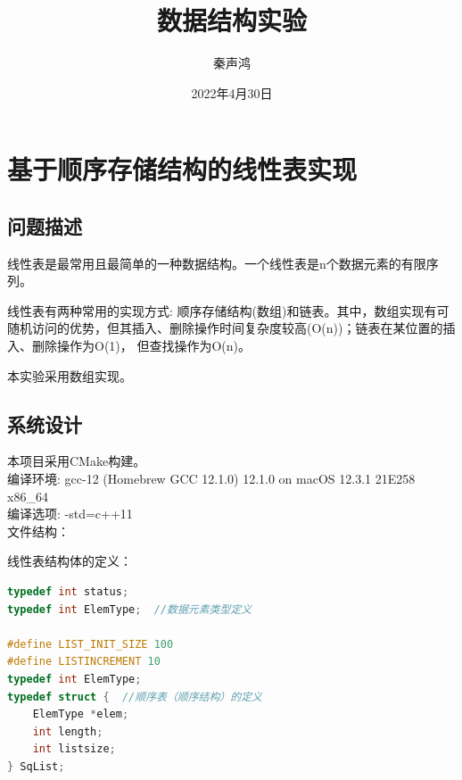 \documentclass[supercite]{Experimental_Report}
\title{~~~~~~数据结构实验~~~~~~}
\author{秦声鸿}
\date{2022年4月30日}
\theoremstyle{definition}
\begin{document}
\maketitle

\clearpage


\tableofcontents[level=2]

\clearpage


\section{基于顺序存储结构的线性表实现}

\subsection{问题描述}

线性表是最常用且最简单的一种数据结构。一个线性表是n个数据元素的有限序列。\cite{DataStructure}

线性表有两种常用的实现方式: 顺序存储结构(数组)和链表。其中，数组实现有可随机访问的优势，但其插入、删除操作时间复杂度较高(O(n))；链表在某位置的插入、删除操作为O(1)， 但查找操作为O(n)。

本实验采用数组实现。

\subsection{系统设计}
\noindent
本项目采用CMake构建。\\
编译环境: gcc-12 (Homebrew GCC 12.1.0) 12.1.0 on macOS 12.3.1 21E258 x86\_64  \\
编译选项:  -std=c++11\\

\noindent
文件结构：

\newpage
\noindent
线性表结构体的定义：
\begin{lstlisting}[language=C++, frame=single]
typedef int status;
typedef int ElemType;  //数据元素类型定义

#define LIST_INIT_SIZE 100
#define LISTINCREMENT 10
typedef int ElemType;
typedef struct {  //顺序表（顺序结构）的定义
	ElemType *elem;
	int length;
	int listsize;
} SqList;
\end{lstlisting}
\end{document}
